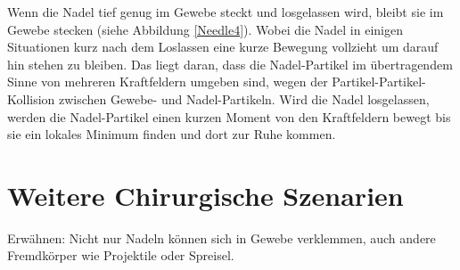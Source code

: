 Wenn die Nadel tief genug im Gewebe steckt und losgelassen wird, bleibt sie im Gewebe stecken (siehe Abbildung \ref{Needle4}). Wobei die Nadel in einigen Situationen kurz nach dem Loslassen eine kurze Bewegung vollzieht um darauf hin stehen zu bleiben. Das liegt daran, dass die Nadel-Partikel im übertragendem Sinne von mehreren Kraftfeldern umgeben sind, wegen der Partikel-Partikel-Kollision zwischen Gewebe- und Nadel-Partikeln. Wird die Nadel losgelassen, werden die Nadel-Partikel einen kurzen Moment von den Kraftfeldern bewegt bis sie ein lokales Minimum finden und dort zur Ruhe kommen.

\section{Weitere Chirurgische Szenarien}

Erwähnen: Nicht nur Nadeln können sich in Gewebe verklemmen, auch andere Fremdkörper wie Projektile oder Spreisel.




